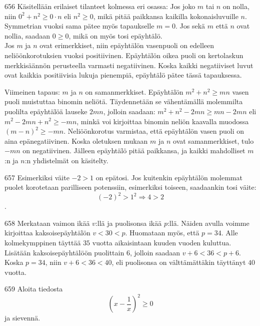\begin{Vastaus}{656}
		Käsitellään erilaiset tilanteet kolmessa eri osassa:
		Jos joko $m$ tai $n$ on nolla, niin $0^2+n^2 \geq 0\cdot n$ eli $n^2\geq 0$, mikä pitää paikkansa kaikilla kokonaisluvuille $n$. Symmetrian vuoksi sama pätee myös tapaukselle $m=0$. Jos sekä $m$ että $n$ ovat nollia, saadaan $0\geq 0$, mikä on myös tosi epäyhtälö. \\
		Jos $m$ ja $n$ ovat erimerkkiset, niin epäyhtälön vasenpuoli on edelleen neliöönkorotuksien vuoksi positiivinen. Epäyhtälön oikea puoli on kertolaskun merkkisäännön perusteella varmasti negatiivinen. Koska kaikki negatiiviset luvut ovat kaikkia positiivisia lukuja pienempiä, epäyhtälö pätee tässä tapauksessa.

		Viimeinen tapaus: $m$ ja $n$ on samanmerkkiset. Epäyhtälön $m^2+n^2 \geq mn$ vasen puoli muistuttaa binomin neliötä. Täydennetään se vähentämällä molemmilta puolilta epäyhtälöä lauseke $2mn$, jolloin saadaan: $m^2+n^2-2mn \geq mn-2mn$ eli $m^2-2mn+n^2 \geq -mn$, minkä voi kirjoittaa binomin neliön kaavalla muodossa $(m-n)^2 \geq -mn$. Neliöönkorotus varmistaa, että epäyhtälön vasen puoli on aina epänegatiivinen. Koska oletuksen mukaan $m$ ja $n$ ovat samanmerkkiset, tulo $-mn$ on negatiivinen. Jälleen epäyhtälö pitää paikkansa, ja kaikki mahdolliset $m$:n ja $n$:n yhdistelmät on käsitelty.
		
\end{Vastaus}
\begin{Vastaus}{657}
	Esimerkiksi väite $-2>1$ on epätosi. Jos kuitenkin epäyhtälön molemmat puolet korotetaan parilliseen potenssiin, esimerkiksi toiseen, saadaankin tosi väite: \[(-2)^2>1^2 \Rightarrow 4>2\].
	
\end{Vastaus}
\begin{Vastaus}{658}
		Merkataan vaimon ikää $v$:llä ja puolisonsa ikää $p$:llä. Näiden avulla voimme kirjoittaa kaksoisepäyhtälön $v<30<p$. Huomataan myös, että $p=34$. Alle kolmekymppinen täyttää $35$ vuotta aikaisintaan kuuden vuoden kuluttua. Lisätään kaksoisepäyhtälöön puolittain $6$, jolloin saadaan $v+6<36<p+6$. Koska $p=34$, niin $v+6<36<40$, eli puolisonsa on välttämättäkin täyttänyt $40$ vuotta.
		
\end{Vastaus}
\begin{Vastaus}{659}
     Aloita tiedosta \[\left(x-\frac{1}{x}\right)^2 \geq 0\] ja sievennä.
    
\end{Vastaus}

